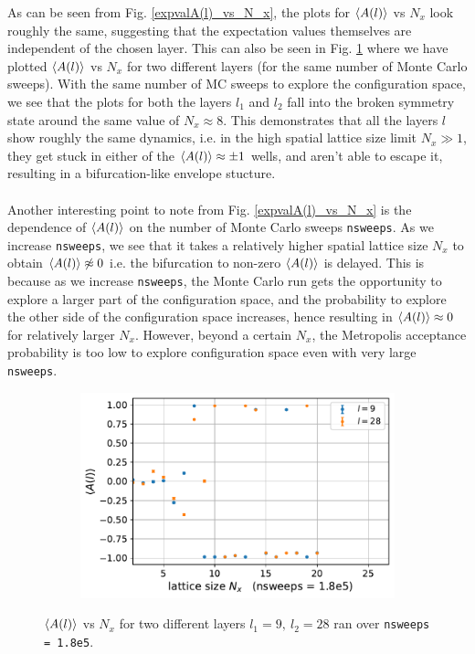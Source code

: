 \documentclass[../thesis_main.tex]{subfiles}
\begin{document}
As can be seen from Fig. \ref{expvalA(l)_vs_N_x}, the plots for $\expval{A(l)}$ vs $N_x$ look roughly the same, suggesting that the expectation values themselves are independent of the chosen layer. This can also be seen in Fig. \ref{differentlayer_sameMCsweeps} where we have plotted $\expval{A(l)}$ vs $N_x$ for two different layers (for the same number of Monte Carlo sweeps). With the same number of MC sweeps to explore the configuration space, we see that the plots for both the layers $l_1$ and $l_2$ fall into the broken symmetry state around the same value of $N_x \approx 8$. This demonstrates that all the layers $l$ show roughly the same dynamics, i.e. in the high spatial lattice size limit $N_x \gg 1$, they get stuck in either of the $\expval{A(l)} \approx \pm 1$ wells, and aren't able to escape it, resulting in a bifurcation-like envelope stucture.~\\~\\
Another interesting point to note from Fig. \ref{expvalA(l)_vs_N_x} is the dependence of $\expval{A(l)}$ on the number of Monte Carlo sweeps \texttt{nsweeps}. As we increase \texttt{nsweeps}, we see that it takes a relatively higher spatial lattice size $N_x$ to obtain $\expval{A(l)} \not\approx 0$ i.e. the bifurcation to non-zero $\expval{A(l)}$ is delayed. This is because as we increase \texttt{nsweeps}, the Monte Carlo run gets the opportunity to explore a larger part of the configuration space, and the probability to explore the other side of the configuration space increases, hence resulting in $\expval{A(l)} \approx 0$ for relatively larger $N_x$. However, beyond a certain $N_x$, the Metropolis acceptance probability is too low to explore configuration space even with very large \texttt{nsweeps}.       
\begin{figure}[!htb]
    \centering
    \begin{subfigure}[b]{0.5\textwidth}
        \centering
        \includegraphics[width=\textwidth]{images/expval(A_l)_vs_N_x/A vs N_x (nsweeps=1.8e5).pdf}
    \end{subfigure}
    \caption{$\expval{A(l)}$ vs $N_x$ for two different layers $l_1 = 9,\: l_2 = 28$ ran over \texttt{nsweeps = 1.8e5}.}
    \label{differentlayer_sameMCsweeps}
\end{figure}
\FloatBarrier
\end{document}
